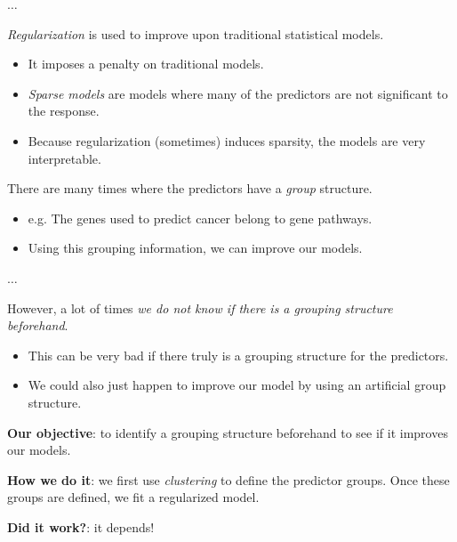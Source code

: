 \documentclass[8pt]{beamer}
\newcommand{\mys}{\vspace{0.5cm} \pause
}
\begin{document}
\begin{frame}{\color{white}$\ldots$}

\textit{Regularization} is used to improve upon traditional statistical models.
\begin{itemize}
    \item It imposes a penalty on traditional models.
    \item \textit{Sparse models} are models where many of the predictors are not significant to the response.
    \item Because regularization (sometimes) induces sparsity, the models are very interpretable.
\end{itemize} \mys

There are many times where the predictors have a \textit{group} structure. 
\begin{itemize}
    \item e.g. The genes used to predict cancer belong to gene pathways.
    \item Using this grouping information, we can improve our models.
\end{itemize} %

    
\end{frame}

\begin{frame}{$\ldots$}

However, a lot of times \textit{we do not know if there is a grouping structure beforehand}. 
\begin{itemize}
    \item This can be very bad if there truly is a grouping structure for the predictors.
    \item We could also just happen to improve our model by using an artificial group structure.
\end{itemize} \mys

\textbf{Our objective}: to identify a grouping structure beforehand to see if it improves our models. \mys

\textbf{How we do it}: we first use \textit{clustering} to define the predictor groups. Once these groups are defined, we fit a regularized model. \mys 

\textbf{Did it work?}: it depends!
    
\end{frame}
\end{document}
